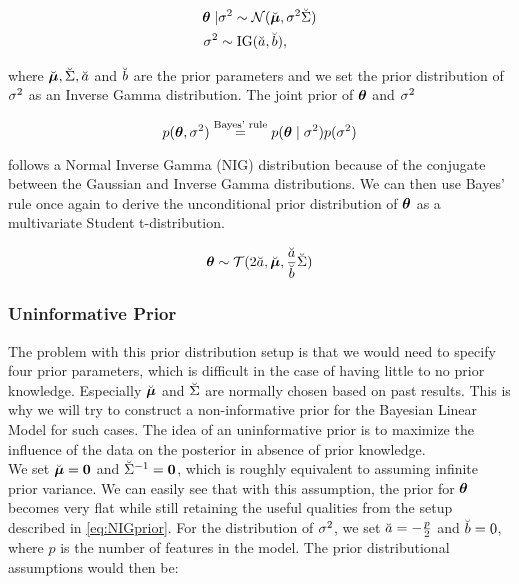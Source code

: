 \begin{equation} \label{eq:NIGprior}
    \begin{aligned}
        \bm{\theta} \mid &\sigma^2 \sim  \mathcal{N}(\breve{\bm{\mu}}, \sigma^2 \breve{\Sigma}) \\
        \sigma^2 &\sim \text{IG}(\breve{a}, \breve{b}),
    \end{aligned}
\end{equation}

where $\breve{\bm{\mu}}, \breve{\Sigma}, \breve{a}$ and $\breve{b}$ are the prior parameters and  we set the prior distribution of $\sigma^2$ as an Inverse Gamma distribution.
The joint prior of $\bm{\theta}$ and $\sigma^2$

\begin{equation*}
    p(\bm{\theta}, \sigma^2) \overset{\text{Bayes' rule}}{=} p(\bm{\theta} \mid \sigma^2) p(\sigma^2)
\end{equation*}

follows a Normal Inverse Gamma (NIG) distribution because of the conjugate between the Gaussian and Inverse Gamma distributions.
We can then use Bayes' rule once again to derive the unconditional prior distribution of $\bm{\theta}$ as a multivariate Student t-distribution. 

\begin{equation*}
    \bm{\theta} \sim \mathcal{T}(2 \breve{a}, \breve{\bm{\mu}}, \frac{\breve{a}}{\breve{b}} \breve{\Sigma})
\end{equation*}

\subsubsection*{Uninformative Prior}
The problem with this prior distribution setup is that we would need to specify four prior parameters, which is difficult in the case of having little to no prior knowledge.
Especially $\breve{\bm{\mu}}$ and $\breve{\Sigma}$ are normally chosen based on past results.
This is why we will try to construct a non-informative prior for the Bayesian Linear Model for such cases.
The idea of an uninformative prior is to maximize the influence of the data on the posterior in absence of prior knowledge.\\

We set $\breve{\bm{\mu}} = \bm{0}$ and $\breve{\Sigma}^{-1} = \bm{0}$, which is roughly equivalent to assuming infinite prior variance.
We can easily see that with this assumption, the prior for $\bm{\theta}$ becomes very flat while still retaining the useful qualities from the setup described in \eqref{eq:NIGprior}.
For the distribution of $\sigma^2$, we set $\breve{a} = - \frac{p}{2}$ and $\breve{b} = 0$, where $p$ is the number of features in the model.
The prior distributional assumptions would then be:


